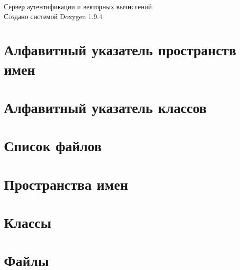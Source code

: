 \documentclass[twoside]{book}
\newcommand{\+}{\discretionary{\mbox{\scriptsize$\hookleftarrow$}}{}{}}
\newcommand{\clearemptydoublepage}{%
    \newpage{\pagestyle{empty}\cleardoublepage}%
  }
\begin{document}
  \raggedbottom
    \hypersetup{pageanchor=false,
                bookmarksnumbered=true,
                pdfencoding=unicode
               }
  \begin{titlepage}
  \vspace*{7cm}
  \begin{center}%
  {\Large Сервер аутентификации и векторных вычислений}\\
  \vspace*{1cm}
  {\large Создано системой Doxygen 1.9.4}\\
  \end{center}
  \end{titlepage}
  \clearemptydoublepage
  \tableofcontents
  \clearemptydoublepage
  \hypersetup{pageanchor=true}
\chapter{Алфавитный указатель пространств имен}

\chapter{Алфавитный указатель классов}

\chapter{Список файлов}

\chapter{Пространства имен}

\chapter{Классы}








\chapter{Файлы}






















  \backmatter
  \newpage
  \clearemptydoublepage
  \printindex
\end{document}

